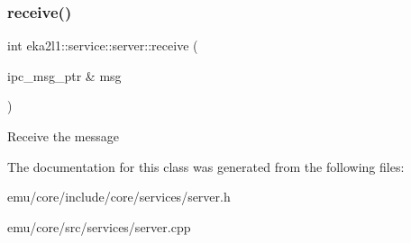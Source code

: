 \subsubsection{\texorpdfstring{receive()}{receive()}}
{\footnotesize\ttfamily int eka2l1\+::service\+::server\+::receive (\begin{DoxyParamCaption}\item[{ipc\+\_\+msg\+\_\+ptr \&}]{msg }\end{DoxyParamCaption})}

Receive the message 

The documentation for this class was generated from the following files\+:\begin{DoxyCompactItemize}
\item 
emu/core/include/core/services/server.\+h\item 
emu/core/src/services/server.\+cpp\end{DoxyCompactItemize}
